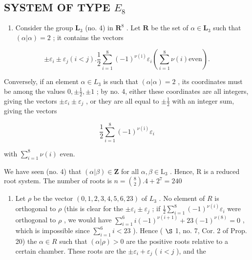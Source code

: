 \subsection{\texorpdfstring{SYSTEM OF TYPE \(E_{8}\)}{SYSTEM OF TYPE E\_8}}

\begin{enumerate}
\def\labelenumi{(\Roman{enumi})}
\tightlist
\item
  Consider the group \(\mathbf{L}_3\) (no. 4) in \(\mathbf{R}^8\) . Let \(\mathbf{R}\) be the set of \(\alpha \in \mathbf{L}_3\) such that \((\alpha |\alpha) = 2\) ; it contains the vectors
\end{enumerate}

\[
\pm \varepsilon_ {i} \pm \varepsilon_ {j} (i <   j). \frac {1}{2} \sum_ {i = 1} ^ {8} (- 1) ^ {\nu (\mathrm{i})} \varepsilon_ {i} \left(\sum_ {i = 1} ^ {8} \nu (i) \text {even}\right).
\]

Conversely, if an element \(\alpha \in L_3\) is such that \((\alpha |\alpha) = 2\) , its coordinates must be among the values \(0, \pm \frac{1}{2}, \pm 1\) ; by no. 4, either these coordinates are all integers, giving the vectors \(\pm \varepsilon_i \pm \varepsilon_j\) , or they are all equal to \(\pm \frac{1}{2}\) with an integer sum, giving the vectors

\[
\frac {1}{2} \sum_ {i = 1} ^ {8} (- 1) ^ {\nu (\mathrm{i})} \varepsilon_ {i}
\]

with \(\sum_{i=1}^{8} \nu(i)\) even.

We have seen (no. 4) that \((\alpha |\beta)\in \mathbf{Z}\) for all \(\alpha ,\beta \in \mathrm{L}_3\) . Hence, R is a reduced root system. The number of roots is \(n = \binom{8}{2}.4 + 2^7 = 240\)

\begin{enumerate}
\def\labelenumi{(\Roman{enumi})}
\setcounter{enumi}{1}
\tightlist
\item
  Let \(\rho\) be the vector \((0,1,2,3,4,5,6,23)\) of \(L_{3}\) . No element of \(R\) is orthogonal to \(\rho\) (this is clear for the \(\pm \varepsilon_{i} \pm \varepsilon_{j}\) ; if \(\frac{1}{2} \sum_{i=1}^{8} (-1)^{\nu(i)} \varepsilon_{i}\) were orthogonal to \(\rho\) , we would have \(\sum_{i=1}^{6} i(-1)^{\nu(i+1)} + 23(-1)^{\nu(8)} = 0\) , which is impossible since \(\sum_{i=1}^{6} i < 23\) ). Hence ( \(\S\) 1, no. 7, Cor. 2 of Prop. 20) the \(\alpha \in R\) such that \((\alpha | \rho) > 0\) are the positive roots relative to a certain chamber. These roots are the \(\pm \varepsilon_{i} + \varepsilon_{j}\) ( \(i < j\) ), and the
\end{enumerate}

